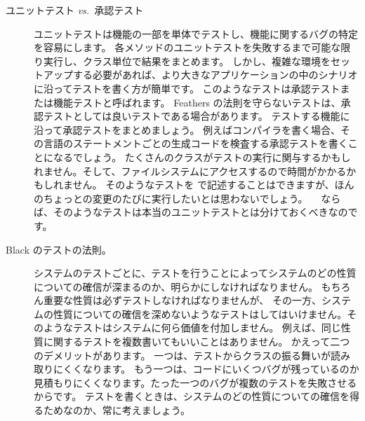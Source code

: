 \documentclass[a4paper,10pt,twoside]{book}
\begin{document}
\begin{description}
 \item[ユニットテスト \textit{vs.}\ 承認テスト]
  ユニットテストは機能の一部を単体でテストし、機能に関するバグの特定を容易にします。
  各メソッドのユニットテストを失敗するまで可能な限り実行し、クラス単位で結果をまとめます。%
  しかし、複雑な環境をセットアップする必要があれば、より大きなアプリケーションの中のシナリオに沿ってテストを書く方が簡単です。
  このようなテストは承認テストまたは機能テストと呼ばれます。
  Feathers の法則を守らないテストは、承認テストとしては良いテストである場合があります。
  テストする機能に沿って承認テストをまとめましょう。
  例えばコンパイラを書く場合、その言語のステートメントごとの生成コードを検査する承認テストを書くことになるでしょう。
  たくさんのクラスがテストの実行に関与するかもしれません。そして、ファイルシステムにアクセスするので時間がかかるかもしれません。
  そのようなテストを \sunit で記述することはできますが、ほんのちょっとの変更のたびに実行したいとは思わないでしょう。
　ならば、そのようなテストは本当のユニットテストとは分けておくべきなのです。

\item[Black のテストの法則。]
  システムのテストごとに、テストを行うことによってシステムのどの性質についての確信が深まるのか、明らかにしなければなりません。
  もちろん重要な性質は必ずテストしなければなりませんが、
  その一方、システムの性質についての確信を深めないようなテストはしてはいけません。そのようなテストはシステムに何ら価値を付加しません。
  例えば、同じ性質に関するテストを複数書いてもいいことはありません。
  かえって二つのデメリットがあります。
  一つは、テストからクラスの振る舞いが読み取りにくくなります。
  もう一つは、コードにいくつバグが残っているのか見積もりにくくなります。たった一つのバグが複数のテストを失敗させるからです。
  テストを書くときは、システムのどの性質についての確信を得るためなのか、常に考えましょう。
\end{description}


\end{document}
